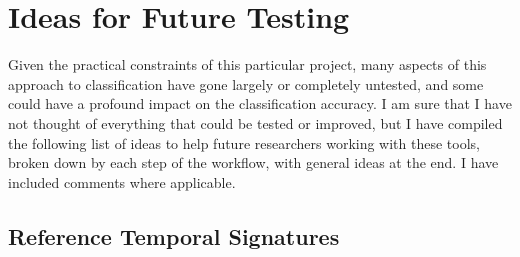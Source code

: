 \chapter{Ideas for Future Testing}
\label{appendix:future}

Given the practical constraints of this particular project, many aspects of this approach to classification have gone largely or completely untested, and some could have a profound impact on the classification accuracy. I am sure that I have not thought of everything that could be tested or improved, but I have compiled the following list of ideas to help future researchers working with these tools, broken down by each step of the workflow, with general ideas at the end. I have included comments where applicable.

\section{Reference Temporal Signatures}

